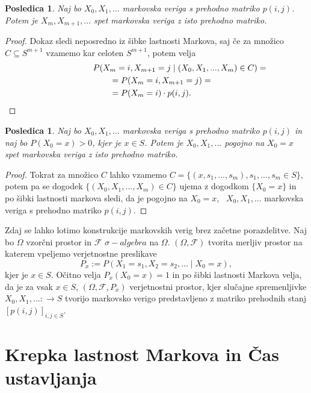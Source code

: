 \documentclass[a4paper,12pt]{article}
\newtheorem{posledica}[izrek]{Posledica}
\begin{document}
\begin{posledica}
    Naj bo $X_0, X_1, ... $ markovska veriga s prehodno matriko $p{(i,j)}$. Potem je $X_m, X_{m+1}, ... $ spet markovska veriga z isto prehodno matriko.
\end{posledica}

\begin{proof}
    Dokaz sledi neposredno iz šibke lastnosti Markova, saj če za množico $C \subseteq S^{m+1}$ vzamemo kar celoten $S^{m+1}$, potem velja 
    \begin{align*}
        \lefteqn{ P(X_{m}=i, \space X_{m+1}=j \mid (X_0, X_1, ..., X_m) \in C )=} \qquad
        \\&=P(X_{m}=i, \space X_{m+1}=j )=  
        \\&= P(X_{m}=i) \cdot p{(i,j)}.
    \end{align*}
\end{proof}

\begin{posledica}
    Naj bo $X_0, X_1, ...$ markovska veriga s prehodno matriko $p(i,j)$ in naj bo $P(X_0=x)>0$, kjer je $x \in S$. Potem je $X_0, X_1, ...$ 
    pogojno na $X_0=x$ spet markovska veriga z isto prehodno matriko.
\end{posledica}

\begin{proof}
    Tokrat za množico $C$ lahko vzamemo $C=\{(x, s_1, ..., s_m), s_1, ..., s_m \in S\}$, potem pa se
     dogodek $\{(X_0, X_1, ...,X_m) \in C\}$ ujema z dogodkom $\{X_0 = x\}$ in po šibki lastnosti markova 
     sledi, da je pogojno na $X_0=x$, \ $X_0, X_1, ...$ markovska veriga s prehodno matriko $p(i,j)$.
\end{proof}

Zdaj se lahko lotimo konstrukcije markovskih verig brez začetne porazdelitve. Naj bo $\Omega$ vzorčni prostor in $\mathcal F$ 
$\sigma-algebra$ na $\Omega$. $(\Omega, \mathcal F)$ tvorita merljiv prostor na katerem vpeljemo verjetnostne 
preslikave $$P_x := P(X_1=s_1, X_2=s_2, ... \mid X_0=x),$$ kjer je $x \in S$. Očitno velja $P_x(X_0=x) = 1$ in po šibki 
lastnosti Markova velja, da je za vsak $x \in S$, $(\Omega, \mathcal F, P_x)$ verjetnostni prostor, kjer slučajne spremenljivke
$X_0, X_1, ... : \rightarrow S$ tvorijo markovsko verigo predstavljeno z matriko prehodnih stanj $[p(i,j)]_{i,j \in S}$.


\newpage
\section{Krepka lastnost Markova in Čas ustavljanja}
\end{document}
